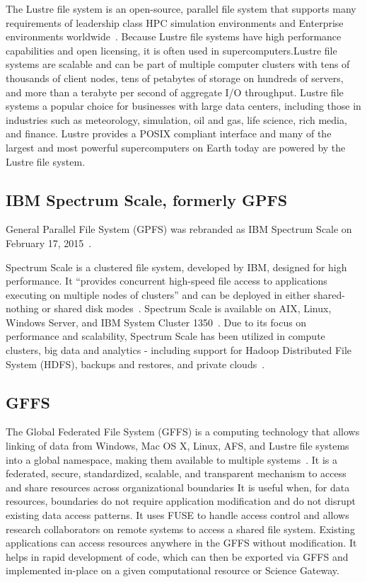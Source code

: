 {The Lustre file system is an open-source, parallel file system that
supports many requirements of leadership class HPC simulation
environments and Enterprise environments
worldwide~\cite{www-lustre}. Because Lustre file systems have high
performance capabilities and open licensing, it is often used in
supercomputers.Lustre file systems are scalable and can be part of
multiple computer clusters with tens of thousands of client nodes,
tens of petabytes of storage on hundreds of servers, and more than a
terabyte per second of aggregate I/O throughput. Lustre file systems a
popular choice for businesses with large data centers, including those
in industries such as meteorology, simulation, oil and gas, life
science, rich media, and finance. Lustre provides a POSIX compliant
interface and many of the largest and most powerful supercomputers on
Earth today are powered by the Lustre file system.

     \pv
     
\subsection{IBM Spectrum Scale, formerly GPFS}

General Parallel File System (GPFS) was rebranded as IBM Spectrum
Scale on February 17, 2015~\cite{www-wikigpfs}.

Spectrum Scale is a clustered file system, developed by IBM, designed
for high performance. It ``provides concurrent high-speed file access
to applications executing on multiple nodes of clusters'' and can be
deployed in either shared-nothing or shared disk
modes~\cite{www-wikigpfs}.  Spectrum Scale is available on AIX, Linux,
Windows Server, and IBM System Cluster 1350~\cite{www-wikigpfs}.  Due
to its focus on performance and scalability, Spectrum Scale has been
utilized in compute clusters, big data and analytics - including
support for Hadoop Distributed File System (HDFS), backups and
restores, and private clouds~\cite{www-spectrumscale}.

     \pv

\subsection{GFFS}

The Global Federated File System (GFFS) is a computing technology that
allows linking of data from Windows, Mac OS X, Linux, AFS, and Lustre
file systems into a global namespace, making them available to
multiple systems~\cite{www-gffs}.  It is a federated, secure,
standardized, scalable, and transparent mechanism to access and share
resources across organizational boundaries It is useful when, for data
resources, boundaries do not require application modification and do
not disrupt existing data access patterns. It uses FUSE to handle
access control and allows research collaborators on remote systems to
access a shared file system. Existing applications can access
resources anywhere in the GFFS without modification. It helps in rapid
development of code, which can then be exported via GFFS and
implemented in-place on a given computational resource or Science
Gateway.

}
